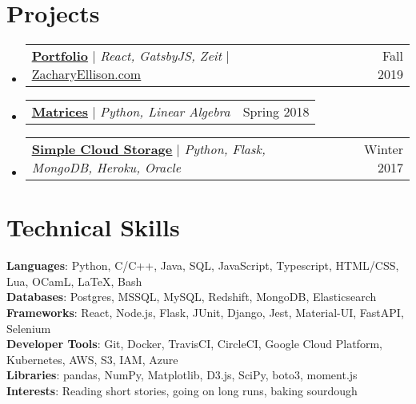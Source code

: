 \documentclass[letterpaper,11pt]{article}
\makeatletter
\newcommand{\resumeProjectHeading}[2]{
    \item
    \begin{tabular*}{0.97\textwidth}{l@{\extracolsep{\fill}}r}
      \small#1 & #2 \\
    \end{tabular*}\vspace{-7pt}
}
\newcommand{\resumeSubHeadingListStart}{\begin{itemize}[leftmargin=0.15in, label={}]}
\newcommand{\resumeSubHeadingListEnd}{\end{itemize}}
\makeatother
\begin{document}
\section{Projects}
    \resumeSubHeadingListStart
      \resumeProjectHeading
          {\href{https://github.com/ZacharyEllison/portfolio}{\underline{\textbf{Portfolio}}} $|$ \emph{React, GatsbyJS, Zeit} $|$ \href{https://zacharyellison.com}{\underline{ZacharyEllison.com}}}{Fall 2019}

      \resumeProjectHeading
          {\href{https://github.com/ZacharyEllison/matrices}{\underline{\textbf{Matrices}}} $|$ \emph{Python, Linear Algebra}} {Spring 2018}
          
      \resumeProjectHeading
      {\href{https://github.com/ZacharyEllison/lylwm}{\underline{\textbf{Simple Cloud Storage}}} $|$ \emph{Python, Flask, MongoDB, Heroku, Oracle}}{Winter 2017}
      
          
    \resumeSubHeadingListEnd



%
\section{Technical Skills}
 \begin{itemize}[leftmargin=0.15in, label={}]
    \small{\item{
     \textbf{Languages}{: Python, C/C++, Java, SQL, JavaScript, Typescript, HTML/CSS, Lua, OCamL, LaTeX, Bash} \\
     \textbf{Databases}{: Postgres, MSSQL, MySQL, Redshift, MongoDB, Elasticsearch} \\
     \textbf{Frameworks}{: React, Node.js, Flask, JUnit, Django, Jest, Material-UI, FastAPI, Selenium} \\
     \textbf{Developer Tools}{: Git, Docker, TravisCI, CircleCI, Google Cloud Platform, Kubernetes, AWS, S3, IAM, Azure} \\
     \textbf{Libraries}{: pandas, NumPy, Matplotlib, D3.js, SciPy, boto3, moment.js} \\
     \textbf{Interests}{: Reading short stories, going on long runs, baking sourdough}
    }}
 \end{itemize}


\end{document}
